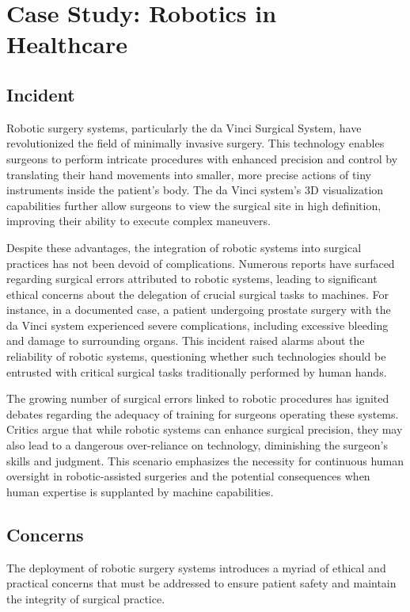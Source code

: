 \section{Case Study: Robotics in Healthcare }

\subsection{Incident}
Robotic surgery systems, particularly the da Vinci Surgical System, have revolutionized the field of minimally invasive surgery. This technology enables surgeons to perform intricate procedures with enhanced precision and control by translating their hand movements into smaller, more precise actions of tiny instruments inside the patient's body. The da Vinci system's 3D visualization capabilities further allow surgeons to view the surgical site in high definition, improving their ability to execute complex maneuvers.

Despite these advantages, the integration of robotic systems into surgical practices has not been devoid of complications. Numerous reports have surfaced regarding surgical errors attributed to robotic systems, leading to significant ethical concerns about the delegation of crucial surgical tasks to machines. For instance, in a documented case, a patient undergoing prostate surgery with the da Vinci system experienced severe complications, including excessive bleeding and damage to surrounding organs. This incident raised alarms about the reliability of robotic systems, questioning whether such technologies should be entrusted with critical surgical tasks traditionally performed by human hands.\cite{COLLINS2022613}

The growing number of surgical errors linked to robotic procedures has ignited debates regarding the adequacy of training for surgeons operating these systems. Critics argue that while robotic systems can enhance surgical precision, they may also lead to a dangerous over-reliance on technology, diminishing the surgeon's skills and judgment. This scenario emphasizes the necessity for continuous human oversight in robotic-assisted surgeries and the potential consequences when human expertise is supplanted by machine capabilities.

\subsection{Concerns}
The deployment of robotic surgery systems introduces a myriad of ethical and practical concerns that must be addressed to ensure patient safety and maintain the integrity of surgical practice.

